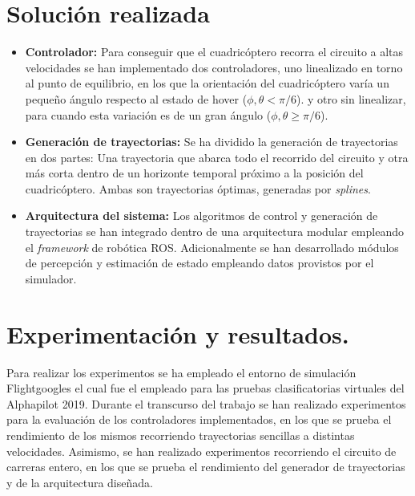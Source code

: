 \section*{Solución realizada}
\begin{itemize}
\item \textbf{Controlador:}
Para conseguir que el cuadricóptero recorra el circuito a altas velocidades se han implementado dos controladores, uno linealizado en torno al punto de equilibrio, en los que la orientación del cuadricóptero varía un pequeño ángulo respecto al estado de hover ($\phi,\theta  < \pi/6 $). y otro sin linealizar, para cuando esta variación es de un gran ángulo ($\phi,\theta  \ge \pi/6 $).

\item \textbf{Generación de trayectorias:} Se ha dividido la generación de trayectorias en dos partes:
Una trayectoria que abarca todo el recorrido del circuito y otra más corta dentro de un horizonte temporal próximo a la posición del cuadricóptero. Ambas son trayectorias óptimas, generadas por \textit{splines}.

\item \textbf{Arquitectura del sistema:} Los algoritmos de control y generación de trayectorias se han integrado dentro de una arquitectura modular empleando el \textit{framework} de robótica ROS. Adicionalmente se han desarrollado módulos de percepción y estimación de estado empleando datos provistos por el simulador.

\end{itemize}
	

\section*{Experimentación y resultados.}

Para realizar los experimentos se ha empleado el entorno de simulación Flightgoogles \cite{guerra2019flightgoggles}  el cual fue el empleado para las pruebas clasificatorias virtuales del Alphapilot 2019. Durante el transcurso del trabajo se han realizado experimentos para la evaluación de los controladores implementados, en los que se prueba el rendimiento de los mismos recorriendo trayectorias sencillas a distintas velocidades. Asimismo, se han realizado experimentos recorriendo el circuito de carreras entero, en los que se prueba el rendimiento del generador de trayectorias y de la arquitectura diseñada.

